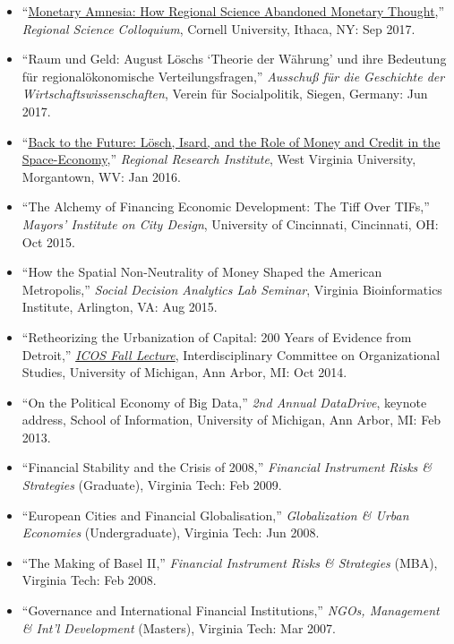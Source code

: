 \documentclass[letter,11pt]{article}
\begin{document}
\begin{itemize}[--]
    \item \enquote{\href{https://aap.cornell.edu/news-events/david-bieri-monetary-amnesia-how-regional-science-abandoned-monetary-thought}{Monetary Amnesia: How Regional Science Abandoned Monetary Thought},} \emph{Regional Science Colloquium}, Cornell University, Ithaca, NY: Sep 2017.
    \item \enquote{Raum und Geld: August L\"{o}schs `Theorie der W\"{a}hrung' und ihre Bedeutung f\"{u}r regional\"{o}ko\-no\-mische Verteilungsfragen,} \emph{Ausschu{\ss} f\"{u}r die Geschichte der Wirtschaftswissenschaften}, Verein f\"{u}r Socialpolitik, Siegen, Germany: Jun 2017.
    \item \enquote{\href{http://rri.wvu.edu/about/photos/dr-bieri-seminar/}{Back to the Future: L\"{o}sch, Isard, and the Role of Money and Credit in the Space-Economy},} \emph{Regional Research Institute}, West Virginia University, Morgantown, WV: Jan 2016.
    \item \enquote{The Alchemy of Financing Economic Development: The Tiff Over TIFs,} \emph{Mayors’ Institute on City Design}, University of Cincinnati, Cincinnati, OH: Oct 2015.
    \item \enquote{How the Spatial Non-Neutrality of Money Shaped the American Metropolis,}  \emph{Social Decision Analytics Lab Seminar}, Virginia Bioinformatics Institute, Arlington, VA: Aug 2015.
    \item \enquote{Retheorizing the Urbanization of Capital: 200 Years of Evidence from Detroit,} \href{http://icos.umich.edu/lecture-2014-10-10}{\emph{ICOS Fall Lecture}}, Interdisciplinary Committee on Organizational Studies, University of Michigan, Ann Arbor, MI: Oct 2014.
    \item \enquote{On the Political Economy of Big Data,} \emph{2nd Annual DataDrive}, keynote address, School of Information, University of Michigan, Ann Arbor, MI: Feb 2013.
    \item \enquote{Financial Stability and the Crisis of 2008,} \emph{Financial Instrument Risks \& Strategies} (Graduate), Virginia Tech: Feb 2009.
    \item \enquote{European Cities and Financial Globalisation,} \emph{Globalization \& Urban Economies} (Undergraduate), Virginia Tech: Jun 2008.
    \item \enquote{The Making of Basel II,} \emph{Financial Instrument Risks \& Strategies} (MBA), Virginia Tech: Feb 2008.
    \item \enquote{Governance and International Financial Institutions,} \emph{NGOs, Management \& Int'l Development} (Masters), Virginia Tech: Mar 2007.

\end{itemize}
\end{document}
